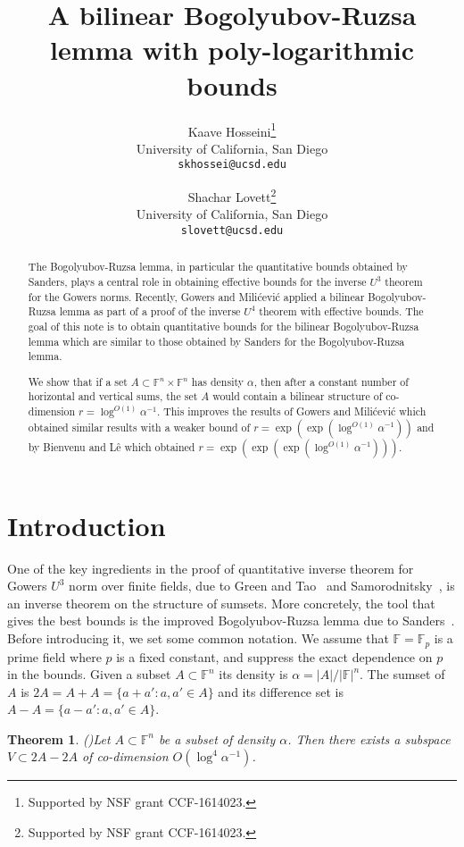 \documentclass[12pt]{article}
\title{A bilinear Bogolyubov-Ruzsa lemma with poly-logarithmic bounds}
\author{
Kaave Hosseini\thanks{Supported by NSF grant CCF-1614023.}\\
University of California, San Diego\\
\texttt{skhossei@ucsd.edu}
\and
Shachar Lovett\thanks{Supported by NSF grant CCF-1614023.}\\
University of California, San Diego\\
\texttt{slovett@ucsd.edu}
}
\newcommand{\F}{\mathbb{F}}
\newtheorem{theorem}{Theorem}[section]
\begin{document}
\maketitle
\begin{abstract}
The Bogolyubov-Ruzsa lemma, in particular the quantitative bounds obtained by Sanders, plays a central role
in obtaining effective bounds for the inverse $U^3$ theorem for the Gowers norms. Recently, Gowers and Mili\'cevi\'c
applied a bilinear Bogolyubov-Ruzsa lemma as part of a proof of the inverse $U^4$ theorem
with effective bounds.
The goal of this note is to obtain quantitative bounds for the bilinear Bogolyubov-Ruzsa lemma which are similar to
	those obtained by Sanders for the Bogolyubov-Ruzsa lemma.

We show that if a set $A \subset \F^n \times \F^n$
has density $\alpha$, then after a constant number of horizontal and vertical sums, the set $A$ would contain a bilinear
structure of co-dimension $r=\log^{O(1)} \alpha^{-1}$. This improves
the results of Gowers and Mili\'cevi\'c which obtained similar results with a weaker bound of
 $r=\exp(\exp(\log^{O(1)} \alpha^{-1}))$ and by Bienvenu and L\^e which obtained $r=\exp(\exp(\exp(\log^{O(1)} \alpha^{-1})))$.
\end{abstract}

\section{Introduction}

One of the key ingredients in the proof of quantitative inverse theorem for Gowers $U^3$ norm over finite fields, due to Green and Tao~\cite{green2008inverse} and Samorodnitsky~\cite{samorodnitsky2007low}, is an inverse theorem on the structure of sumsets. More concretely, the tool that gives the best bounds is the improved Bogolyubov-Ruzsa lemma due to Sanders~\cite{sanders2012bogolyubov}.
Before introducing it, we set some common notation.
We assume that $\F=\F_p$ is a prime field where $p$ is a fixed constant, and suppress the exact dependence on $p$ in the bounds. Given
a subset $A \subset \F^n$ its density is $\alpha = |A|/|\F|^n$. The sumset of $A$ is $2A=A+A=\{a+a': a,a' \in A\}$ and its difference set
is $A-A=\{a-a': a,a' \in A\}$.


\begin{theorem}(\cite{sanders2012bogolyubov})\label{theorem:sanders}
Let $A \subset \F^n $ be a subset of density $\alpha$. Then there exists a subspace $V\subset 2A-2A$ of co-dimension $O(\log^4 \alpha^{-1})$.
\end{theorem}
\end{document}
